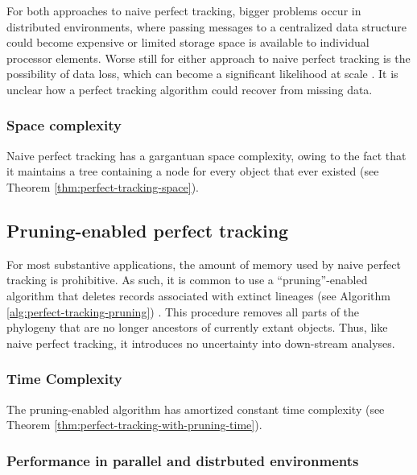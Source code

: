 For both approaches to naive perfect tracking, bigger problems occur in distributed environments, where passing messages to a centralized data structure could become expensive \citep{moreno2022hereditary} or limited storage space is available to individual processor elements.
Worse still for either approach to naive perfect tracking is the possibility of data loss, which can become a significant likelihood at scale \citep{cappello2014toward}.
It is unclear how a perfect tracking algorithm could recover from missing data.

\subsubsection{Space complexity}

Naive perfect tracking has a gargantuan space complexity, owing to the fact that it maintains a tree containing a node for every object that ever existed (see Theorem \ref{thm:perfect-tracking-space}).



\subsection{Pruning-enabled perfect tracking}
\label{sec:naive-perfect-tracking-with-pruning}

For most substantive applications, the amount of memory used by naive perfect tracking is prohibitive.
As such, it is common to use a ``pruning''-enabled algorithm that deletes records associated with extinct lineages (see Algorithm \ref{alg:perfect-tracking-pruning}) \citep{dolson2023phylotrackpy}.
This procedure removes all parts of the phylogeny that are no longer ancestors of currently extant objects.
Thus, like naive perfect tracking, it introduces no uncertainty into down-stream analyses.



\subsubsection{Time Complexity}

The pruning-enabled algorithm has amortized constant time complexity (see Theorem \ref{thm:perfect-tracking-with-pruning-time}).



\subsubsection{Performance in parallel and distrbuted environments}
\label{sec:perfect-tracking-pruning-distrbuted}

